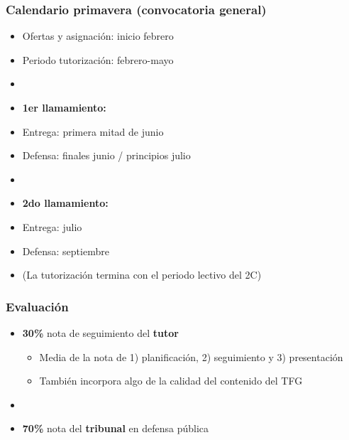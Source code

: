 \documentclass[aspectratio=43]{beamer}
\begin{document}
\begin{frame}
\frametitle{Calendario primavera (convocatoria general)}
\centering

\begin{itemize}
  \item Ofertas y asignación: inicio febrero
  \item Periodo tutorización: febrero-mayo
  \item[]
  \item \textbf{1er llamamiento:}
  \item[-] Entrega: primera mitad de junio
  \item[-] Defensa: finales junio / principios julio
  \item[]
  \item \textbf{2do llamamiento:}
  \item[-] Entrega: julio
  \item[-] Defensa: septiembre
  \item[] (La tutorización termina con el periodo lectivo del 2C)
\end{itemize}

\end{frame}

\begin{frame}
\frametitle{Evaluación}
\centering

\begin{itemize}
  \item \textbf{30\%} nota de seguimiento del \textbf{tutor}
  \begin{itemize}
    \item Media de la nota de 1) planificación, 2) seguimiento y 3) presentación
    \item También incorpora algo de la calidad del contenido del TFG
  \end{itemize}
  \item[]
  \item \textbf{70\%} nota del \textbf{tribunal} en defensa pública
\end{itemize}

\end{frame}
\end{document}
